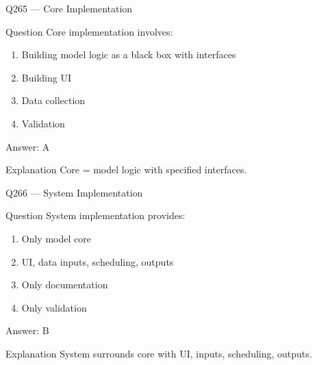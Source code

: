 \documentclass[aspectratio=169,8pt]{beamer}
\begin{document}
								\begin{frame}{Q265 --- Core Implementation}
									\begin{block}{Question}
										Core implementation involves:
										\begin{enumerate}
											\item Building model logic as a black box with interfaces
											\item Building UI
											\item Data collection
											\item Validation
										\end{enumerate}
									\end{block}
									\begin{exampleblock}{Answer: A}\end{exampleblock}
									\begin{block}{Explanation}
										Core = model logic with specified interfaces.
									\end{block}
								\end{frame}
								
								\begin{frame}{Q266 --- System Implementation}
									\begin{block}{Question}
										System implementation provides:
										\begin{enumerate}
											\item Only model core
											\item UI, data inputs, scheduling, outputs
											\item Only documentation
											\item Only validation
										\end{enumerate}
									\end{block}
									\begin{exampleblock}{Answer: B}\end{exampleblock}
									\begin{block}{Explanation}
										System surrounds core with UI, inputs, scheduling, outputs.
									\end{block}
								\end{frame}
								
\end{document}
